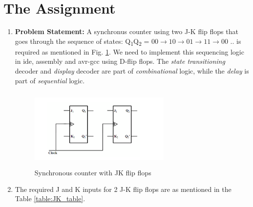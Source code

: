\documentclass[journal,12pt,twocolumn]{IEEEtran}
\begin{document}
\section{\textbf{The Assignment}}
\begin{enumerate}[1.]
\item \textbf{Problem Statement:} A synchronus counter using two J-K flip flops that goes through the sequence of states: Q\textsubscript{1}Q\textsubscript{2} = $00 \rightarrow 10 \rightarrow 01 \rightarrow 11 \rightarrow 00$ .. is required as mentioned in Fig. \ref{fig:JKcounter}.  We need to implement this sequencing logic in ide, assembly and avr-gcc using D-flip flops. The {\em state transitioning } decoder and {\em display} decoder are part of {\em combinational} logic, while the {\em delay} is part of {\em sequential} logic.

\begin{figure}[!h]
	\begin{center}
	\includegraphics[width=7cm,height=4cm]{./JK1}
\end{center}
\caption{Synchronous counter with JK flip flops}
\label{fig:JKcounter}
\end{figure}
%

\item The required J and K inputs for 2 J-K flip flops are as mentioned in the Table \ref{table:JK_table}. \\


\end{enumerate}
\end{document}

